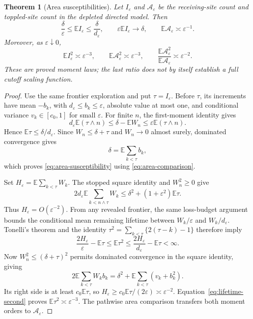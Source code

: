 \documentclass[11pt]{article}
\numberwithin{equation}{section}
\newtheorem{theorem}{Theorem}[section]
\theoremstyle{definition}
\newcommand{\E}{\mathbb E}
\begin{document}
\begin{theorem}[Area susceptibilities]\label{thm:area-susceptibility}
Let $I_\varepsilon$ and $\mathcal A_\varepsilon$ be the receiving-site count and toppled-site count in the depleted directed model. Then
\begin{equation}\label{eq:area-susceptibility}
 \frac\delta\varepsilon\le\E I_\varepsilon\le\frac\delta{d_\varepsilon},
 \qquad \varepsilon\E I_\varepsilon\longrightarrow\delta,
 \qquad \E\mathcal A_\varepsilon\asymp\varepsilon^{-1}.
\end{equation}
Moreover, as $\varepsilon\downarrow0$,
\begin{equation}\label{eq:area-second-moment}
 \E I_\varepsilon^2\asymp\varepsilon^{-3},\qquad
 \E\mathcal A_\varepsilon^2\asymp\varepsilon^{-3},\qquad
 \frac{\E\mathcal A_\varepsilon^2}{\E\mathcal A_\varepsilon}
 \asymp\varepsilon^{-2}.
\end{equation}
These are proved moment laws; the last ratio does not by itself establish a full cutoff scaling function.
\end{theorem}
\begin{proof}
Use the same frontier exploration and put $\tau=I_\varepsilon$. Before $\tau$, its increments have mean $-b_k$, with $d_\varepsilon\le b_k\le\varepsilon$, absolute value at most one, and conditional variance $v_k\in[c_0,1]$ for small $\varepsilon$.
For finite $n$, the first-moment identity gives
\[
 d_\varepsilon\E(\tau\wedge n)\le\delta-\E W_n\le\varepsilon\E(\tau\wedge n).
\]
Hence $\E\tau\le\delta/d_\varepsilon$. Since $W_n\le\delta+\tau$ and $W_n\to0$ almost surely, dominated convergence gives
\begin{equation}\label{eq:frontier-loss-budget}
 \delta=\E\sum_{k<\tau}b_k,
\end{equation}
which proves \eqref{eq:area-susceptibility} using \eqref{eq:area-comparison}.

Set $H_\varepsilon=\E\sum_{k<\tau}W_k$. The stopped square identity and $W_n^2\ge0$ give
\[
 2d_\varepsilon\E\sum_{k<n\wedge\tau}W_k
 \le\delta^2+(1+\varepsilon^2)\E\tau.
\]
Thus $H_\varepsilon=O(\varepsilon^{-2})$. From any revealed frontier, the same loss-budget argument bounds the conditional mean remaining lifetime between $W_k/\varepsilon$ and $W_k/d_\varepsilon$. Tonelli's theorem and the identity
$\tau^2=\sum_{k<\tau}\{2(\tau-k)-1\}$ therefore imply
\begin{equation}\label{eq:lifetime-second}
 \frac{2H_\varepsilon}{\varepsilon}-\E\tau
 \le\E\tau^2\le\frac{2H_\varepsilon}{d_\varepsilon}-\E\tau<\infty.
\end{equation}
Now $W_n^2\le(\delta+\tau)^2$ permits dominated convergence in the square identity, giving
\begin{equation}\label{eq:frontier-square-budget}
 2\E\sum_{k<\tau}W_kb_k
 =\delta^2+\E\sum_{k<\tau}(v_k+b_k^2).
\end{equation}
Its right side is at least $c_0\E\tau$, so $H_\varepsilon\ge c_0\E\tau/(2\varepsilon)\asymp\varepsilon^{-2}$. Equation~\eqref{eq:lifetime-second} proves $\E\tau^2\asymp\varepsilon^{-3}$. The pathwise area comparison transfers both moment orders to $\mathcal A_\varepsilon$.
\end{proof}
\end{document}
